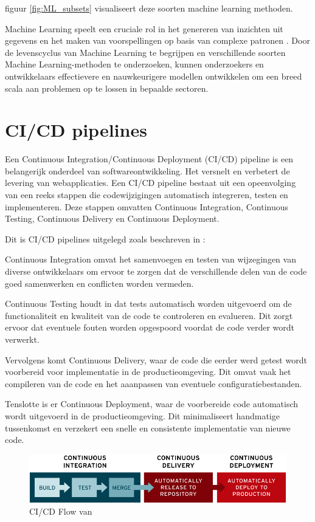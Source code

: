 figuur \ref*{fig:ML_subsets} visualiseert deze soorten machine learning methoden.

Machine Learning speelt een cruciale rol in het genereren van inzichten uit gegevens en het maken van voorspellingen op basis van complexe patronen \autocite{Jordan2015}. Door de levenscyclus van Machine Learning te begrijpen en verschillende soorten Machine Learning-methoden te onderzoeken, kunnen onderzoekers en ontwikkelaars effectievere en nauwkeurigere modellen ontwikkelen om een breed scala aan problemen op te lossen in bepaalde sectoren.
\section{CI/CD pipelines}
Een Continuous Integration/Continuous Deployment (CI/CD) pipeline is een belangerijk onderdeel van softwareontwikkeling. Het versnelt en verbetert de levering van webapplicaties. Een CI/CD pipeline bestaat uit een opeenvolging van een reeks stappen die codewijzigingen automatisch integreren, testen en implementeren. Deze stappen omvatten Continuous Integration, Continuous Testing, Continuous Delivery en Continuous Deployment.

Dit is CI/CD pipelines uitgelegd zoals beschreven in \textcite{NaveenVemuri2024}:

Continuous Integration omvat het samenvoegen en testen van wijzegingen van diverse ontwikkelaars om ervoor te zorgen dat de verschillende delen van de code goed samenwerken en conflicten worden vermeden.

Continuous Testing houdt in dat tests automatisch worden uitgevoerd om de functionaliteit en kwaliteit van de code te controleren en evalueren. Dit zorgt ervoor dat eventuele fouten worden opgespoord voordat de code verder wordt verwerkt.

Vervolgens komt Continuous Delivery, waar de code die eerder werd getest wordt voorbereid voor implementatie in de productieomgeving. Dit omvat vaak het compileren van de code en het aaanpassen van eventuele configuratiebestanden.

Tenslotte is er Continuous Deployment, waar de voorbereide code automatisch wordt uitgevoerd in de productieomgeving. Dit minimaliseert handmatige tussenkomst en verzekert een snelle en consistente implementatie van nieuwe code.\newline

\begin{figure}[h]
    \includegraphics[width=\linewidth]{graphics/cdci.png}
    \caption{CI/CD Flow van \autocite{RedHat2023}}
    \label{fig:CICD_flow}
\end{figure}
  
